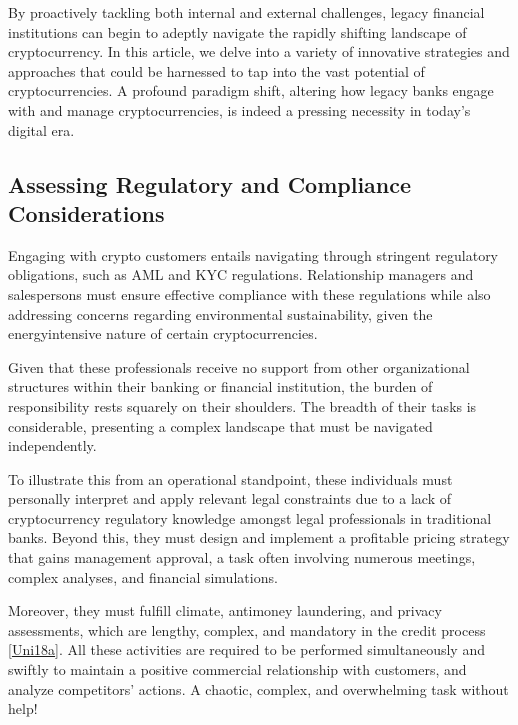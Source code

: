 \documentclass[letterpaper,10pt,english]{jupyterBook}
\begin{document}
\sphinxAtStartPar
By proactively tackling both internal and external challenges, legacy financial institutions can begin to adeptly navigate the rapidly shifting landscape of cryptocurrency. In this article, we delve into a variety of innovative strategies and approaches that could be harnessed to tap into the vast potential of cryptocurrencies. A profound paradigm shift, altering how legacy banks engage with and manage cryptocurrencies, is indeed a pressing necessity in today’s digital era.


\subsection{Assessing Regulatory and Compliance Considerations}
\label{\detokenize{LEGACY/legacy:assessing-regulatory-and-compliance-considerations}}
\sphinxAtStartPar
Engaging with crypto customers entails navigating through stringent regulatory obligations, such as AML and KYC regulations. Relationship managers and salespersons must ensure effective compliance with these regulations while also addressing concerns regarding environmental sustainability, given the energy\sphinxhyphen{}intensive nature of certain cryptocurrencies.

\sphinxAtStartPar
Given that these professionals receive no support from other organizational structures within their banking or financial institution, the burden of responsibility rests squarely on their shoulders. The breadth of their tasks is considerable, presenting a complex landscape that must be navigated independently.

\sphinxAtStartPar
To illustrate this from an operational standpoint, these individuals must personally interpret and apply relevant legal constraints due to a lack of cryptocurrency regulatory knowledge amongst legal professionals in traditional banks. Beyond this, they must design and implement a profitable pricing strategy that gains management approval, a task often involving numerous meetings, complex analyses, and financial simulations.

\sphinxAtStartPar
Moreover, they must fulfill climate, anti\sphinxhyphen{}money laundering, and privacy assessments, which are lengthy, complex, and mandatory in the credit process {[}\hyperlink{cite.LEGACY/legacy:id95}{Uni18a}{]}. All these activities are required to be performed simultaneously and swiftly to maintain a positive commercial relationship with customers, and analyze competitors’ actions. A chaotic, complex, and overwhelming task without help!
\end{document}
